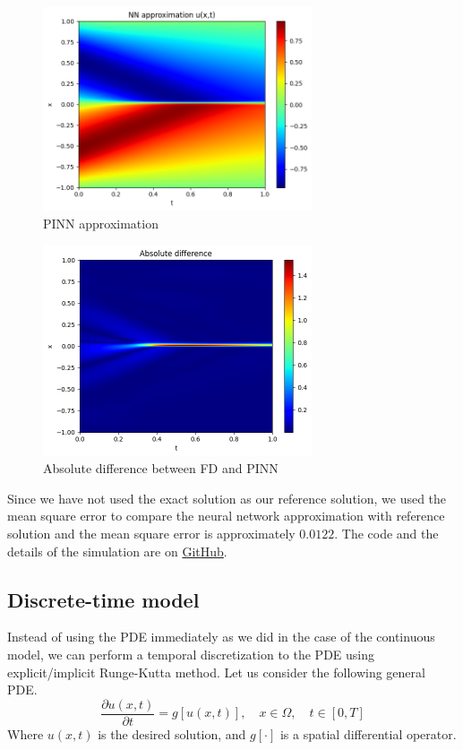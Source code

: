 \documentclass[a4paper, onecolumn, 12pt]{article}
\begin{document}
\begin{figure}[H]
    \centering 
    \includegraphics[width=300px]{images/NN_burgers_pde.png}
    \vspace{-1em}
    \caption{PINN approximation}
    \label{pinn_approx_burgers}
\end{figure}

\begin{figure}[H]
    \centering 
    \includegraphics[width=300px]{images/abs_difference_burgers.png}
    \vspace{-1em}
    \caption{Absolute difference between FD and PINN}
    \label{abs_difference_burgers}
\end{figure}

Since we have not used the 
exact solution as our reference solution, we used the mean square error to compare the neural network approximation 
with reference solution and the mean square error is approximately $0.0122$. The code and the details of the simulation
are on \href{https://github.com/HashimAlSadah/MX-Project/blob/main/PINN/continuous_time_model/Continuous_time_PINN_Burgers_PDE.ipynb}
{GitHub}.

\subsection{Discrete-time model}
Instead of using the PDE immediately as we did in the case of the continuous model, 
we can perform a temporal discretization to the PDE using explicit/implicit Runge-Kutta method\cite{raissi2019physics}.
Let us consider the following general PDE.
\begin{equation}\label{main_discrete_time_eq}
\frac{\partial u(x,t)}{\partial t} = g[u(x,t)], \quad x \in \Omega, \quad t \in [0, T]
\end{equation}
Where $u(x,t)$ is the desired solution, and $g[\cdot]$ is a spatial differential operator.
\end{document}
